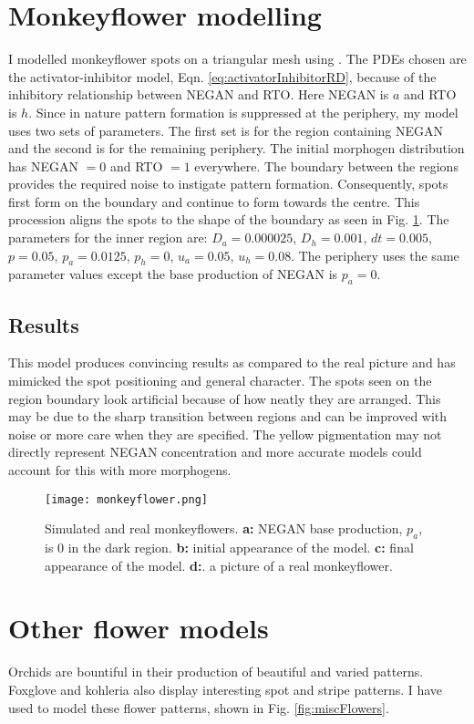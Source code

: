 \section{Monkeyflower modelling}
I modelled monkeyflower spots on a triangular mesh using \ProgramName{}. The PDEs chosen are the activator-inhibitor model, Eqn. \eqref{eq:activatorInhibitorRD}, because of the inhibitory relationship between NEGAN and RTO. Here NEGAN is $a$ and RTO is $h$. Since in nature pattern formation is suppressed at the periphery, my model uses two sets of parameters. The first set is for the region containing NEGAN and the second is for the remaining periphery. The initial morphogen distribution has NEGAN $= 0$ and RTO $= 1$ everywhere. The boundary between the regions provides the required noise to instigate pattern formation. Consequently, spots first form on the boundary and continue to form towards the centre. This procession aligns the spots to the shape of the boundary as seen in Fig. \ref{fig:monkeyflower}. The parameters for the inner region are: $D_a=0.000025$, $D_h=0.001$, $dt=0.005$, $p=0.05$, $p_a=0.0125$, $p_h=0$, $u_a=0.05$, $u_h=0.08$. The periphery uses the same parameter values except the base production of NEGAN is $p_a=0$.

\subsection*{Results}
This model produces convincing results as compared to the real picture and has mimicked the spot positioning and general character. The spots seen on the region boundary look artificial because of how neatly they are arranged. This may be due to the sharp transition between regions and can be improved with noise or more care when they are specified. The yellow pigmentation may not directly represent NEGAN concentration and more accurate models could account for this with more morphogens.

\begin{figure}[ht]
	\centering
	\texttt{[image: monkeyflower.png]}
	\caption{Simulated and real monkeyflowers. \textbf{a:} NEGAN base production, $p_a$, is 0 in the dark region. \textbf{b:} initial appearance of the model. \textbf{c:} final appearance of the model. \textbf{d:}. a picture of a real monkeyflower.}
	\label{fig:monkeyflower}
\end{figure}

\section{Other flower models}
Orchids are bountiful in their production of beautiful and varied patterns. Foxglove and kohleria also display interesting spot and stripe patterns. I have used \ProgramName{} to model these flower patterns, shown in Fig. \ref{fig:miscFlowers}.

